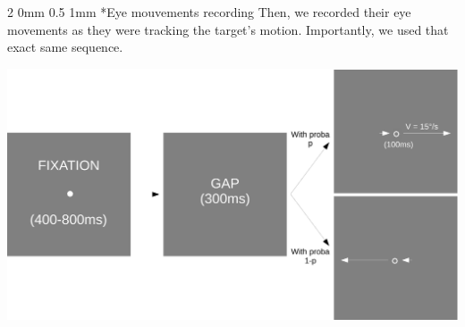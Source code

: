 \documentclass[profile,final,english, draft]{sciposter}%
\makeatletter
\renewcommand{\section}{\@startsection
        {section}%
        {1}%
        {0mm}%
        {1\baselineskip}%
        {1mm}%
        {\large\color{red}\bfseries}}%
\renewcommand{\subsection}{\@startsection
        {subsection}%
        {2}%
        {0mm}%
        {0.5\baselineskip}%
        {1mm}%
        {\normalsize\color[rgb]{0.4,0,0}\bfseries}}%
\makeatother
\begin{document}
\begin{multicols}{3}
\subsection*{Eye mouvements recording}
Then, we recorded their eye movements as they were tracking the target's motion. Importantly, we used that exact same sequence.
\begin{center} 
    \includegraphics[width=1\columnwidth]{materiel_recording}
\end{center}









\end{multicols}
\end{document}
